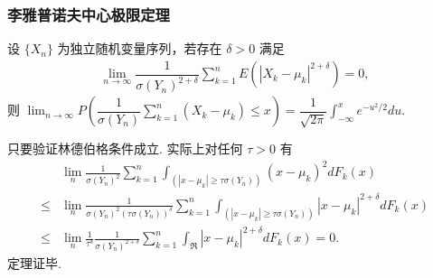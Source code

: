 \begin{frame}
	\frametitle{李雅普诺夫中心极限定理}
	\begin{thm} 设 $\{X_n\}$ 为独立随机变量序列，若存在 $\delta>0$ 满足
		\begin{eqnarray*}
			\lim_{n\rightarrow\infty}\dfrac{1}{\sigma(Y_n)^{2+\delta}}\sum_{k=1}^nE(|X_k-\mu_k|^{2+\delta})=0,
		\end{eqnarray*}
		则 $\lim_{n\rightarrow\infty}P(\dfrac{1}{\sigma(Y_n)}\sum_{k=1}^n(X_k-\mu_k)\le x)=\dfrac{1}{\sqrt{2\pi}}\int_{-\infty}^xe^{-u^2/2}du$.

	\end{thm}

	\zheng 只要验证林德伯格条件成立. 实际上对任何 $\tau>0$ 有
	\begin{align*}
		& \lim _{n} \frac{1}{\sigma(Y_n)^{2}} \sum_{k=1}^{n} \int_{\left(\left|x-\mu_k\right| \geq \tau \sigma(Y_n)\right)}\left(x-\mu_{k}\right)^{2} d F_{k}(x) \\
		\leq & \lim _{n} \frac{1}{\sigma(Y_n)^{2}\left(\tau \sigma(Y_n)\right)^{\delta}} \sum_{k=1}^{n} \int_{\left(\left|x-\mu_k\right| \geq \tau \sigma(Y_n)\right)}\left|x-\mu_k\right|^{2+\delta} d F_{k}(x) \\
		\leq & \lim _{n} \frac{1}{\tau^{\delta}} \frac{1}{\sigma(Y_n)^{2+\delta}} \sum_{k=1}^{n} \int_{\Re}\left|x-\mu_{k}\right|^{2+\delta} d F_{k}(x)=0 .
	\end{align*}
	定理证毕.
\end{frame}








